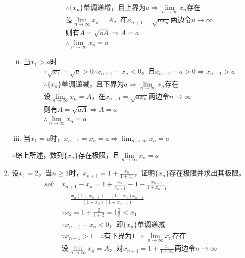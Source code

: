 \begin{enumerate}[{例}1.]
\begin{enumerate}[(i)]
\begin{align*}
                    &\therefore \{x_n\}\mbox{单调递增，且上界为}a\Rightarrow\lim_{n \to \infty}x_n\mbox{存在}\\
                    &\mbox{设}\lim_{n \to \infty}x_n=A\mbox{，在}x_{n+1}=\sqrt{ax_n}\mbox{两边令}n\to\infty\\
                    &\mbox{则有}A=\sqrt{aA}\Rightarrow A=a\\
                    &\therefore\lim_{n \to \infty}x_n=a
                \end{align*}
            \item 当$x_1>a$时
                \begin{align*}
                    &\because\sqrt{x_1}-\sqrt{a}>0\therefore x_{n+1}-x_n<0\mbox{，且}x_{n+1}-a>0\Rightarrow x_{n+1}>a\\
                    &\therefore \{x_n\}\mbox{单调递减，且下界为}a\Rightarrow\lim_{n \to \infty}x_n\mbox{存在}\\
                    &\mbox{设}\lim_{n \to \infty}x_n=A\mbox{，在}x_{n+1}=\sqrt{ax_n}\mbox{两边令}n\to\infty\\
                    &\mbox{则有}A=\sqrt{aA}\Rightarrow A=a\\
                    &\therefore\lim_{n \to \infty}x_n=a
                \end{align*}
            \item 当$x_1=a$时，$x_{n+1}=x_n=a\Rightarrow \lim_{n \to \infty}x_n=a$
        \end{enumerate}
        $\therefore$综上所述，数列$\{x_n\}$存在极限，且$\lim\limits_{n \to \infty}x_n=a$
    \item 设$x_1=2$，当$n\geq1$时，$x_{n+1}=1+\frac{x_n}{1+x_n}$，证明$\{x_n\}$存在极限并求出其极限。
        \begin{align*}
            sol:&x_{n+1}-x_n=1+\frac{x_n}{x_{n+1}}-1-\frac{x_{n-1}}{1+x_{n-1}}\\
                &=\frac{x_n (1+x_{n-1})-(1+x_n)x_{n-1}}{(1+x_n)(1+x_{n-1})}\\
                &\because x_2=1+\frac{2}{1+2}=1\frac{2}{3}<x_1\\
                &\therefore x_{n+1}-x_n<0\mbox{，即}\{x_n\}\mbox{单调递减}\\
                &\because x_{n+1}>1\quad \therefore\mbox{有下界为1}\Rightarrow \lim_{n \to \infty}x_n\mbox{存在}\\
                &\mbox{设}\lim_{n \to \infty}x_n=A\mbox{，对}x_{n+1}=1+\frac{x_n}{1+x_n}\mbox{两边令}n\to \infty\\

\end{align*}
\end{enumerate}
